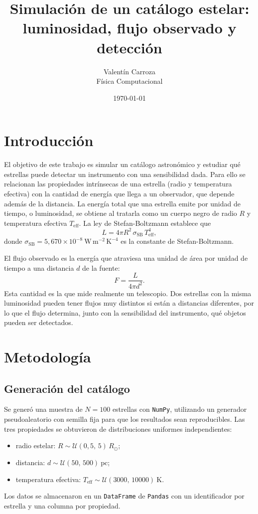 \documentclass[11pt,a4paper]{article}
\title{Simulación de un catálogo estelar: luminosidad, flujo observado y detección}
\author{Valentín Carroza\\ \small  Física Computacional}
\date{\today}
\begin{document}
\maketitle
\section{Introducción}
El objetivo de este trabajo es simular un catálogo astronómico y estudiar qué estrellas puede detectar un instrumento con una sensibilidad dada. Para ello se relacionan las propiedades intrínsecas de una estrella (radio y temperatura efectiva) con la cantidad de energía que llega a un observador, que depende además de la distancia.
La energía total que una estrella emite por unidad de tiempo, o luminosidad, se obtiene al tratarla como un cuerpo negro de radio $R$ y temperatura efectiva $T_{\mathrm{eff}}$. La ley de
Stefan-Boltzmann establece que
\begin{equation}
  L = 4\pi R^{2}\,\sigma_{\mathrm{SB}}\,T_{\mathrm{eff}}^{4},
  \label{eq:stefan}
\end{equation}
donde $\sigma_{\mathrm{SB}} = 5{,}670\times10^{-8}\ \mathrm{W\,m^{-2}\,K^{-4}}$ es la constante de Stefan-Boltzmann.

El flujo observado es la energía que atraviesa una unidad de área por unidad de tiempo a una distancia $d$ de la fuente:
\begin{equation}
  F = \frac{L}{4\pi d^{2}}.
  \label{eq:flujo}
\end{equation}
Esta cantidad es la que mide realmente un telescopio. Dos estrellas con la misma luminosidad pueden tener flujos muy distintos si están a distancias diferentes, por lo que el flujo determina, junto con la sensibilidad del instrumento, qué objetos pueden ser detectados.

\section{Metodología}
\subsection{Generación del catálogo}
Se generó una muestra de $N=100$ estrellas con \texttt{NumPy}, utilizando un generador pseudoaleatorio con semilla fija para que los resultados sean reproducibles. Las tres propiedades se obtuvieron de distribuciones uniformes independientes:
\begin{itemize}
  \item radio estelar: $R \sim \mathcal{U}(0{,}5,\,5)\,R_\odot$;
  \item distancia: $d \sim \mathcal{U}(50,\,500)\ \mathrm{pc}$;
  \item temperatura efectiva: $T_{\mathrm{eff}} \sim \mathcal{U}(3000,\,10000)\ \mathrm{K}$.
\end{itemize}
Los datos se almacenaron en un \texttt{DataFrame} de \texttt{Pandas} con un identificador por estrella y una columna por propiedad.
\end{document}
